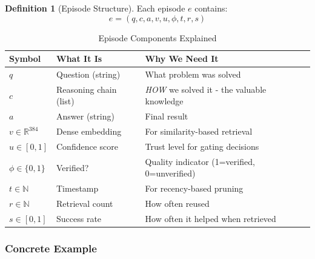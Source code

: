 \documentclass[12pt,a4paper]{article}
\theoremstyle{definition}
\newtheorem{definition}[theorem]{Definition}
\newcommand{\R}{\mathbb{R}}
\begin{document}
\begin{definition}[Episode Structure]
Each episode $e$ contains:
\begin{equation}
e = (q, c, a, v, u, \phi, t, r, s)
\end{equation}
\end{definition}

\begin{table}[h]
\centering
\caption{Episode Components Explained}
\begin{tabular}{lp{4cm}p{6cm}}
\toprule
\textbf{Symbol} & \textbf{What It Is} & \textbf{Why We Need It} \\
\midrule
$q$ & Question (string) & What problem was solved \\
$c$ & Reasoning chain (list) & \textit{HOW} we solved it - the valuable knowledge \\
$a$ & Answer (string) & Final result \\
$v \in \R^{384}$ & Dense embedding & For similarity-based retrieval \\
$u \in [0,1]$ & Confidence score & Trust level for gating decisions \\
$\phi \in \{0,1\}$ & Verified? & Quality indicator (1=verified, 0=unverified) \\
$t \in \mathbb{N}$ & Timestamp & For recency-based pruning \\
$r \in \mathbb{N}$ & Retrieval count & How often reused \\
$s \in [0,1]$ & Success rate & How often it helped when retrieved \\
\bottomrule
\end{tabular}
\end{table}

\subsubsection{Concrete Example}
\end{document}
